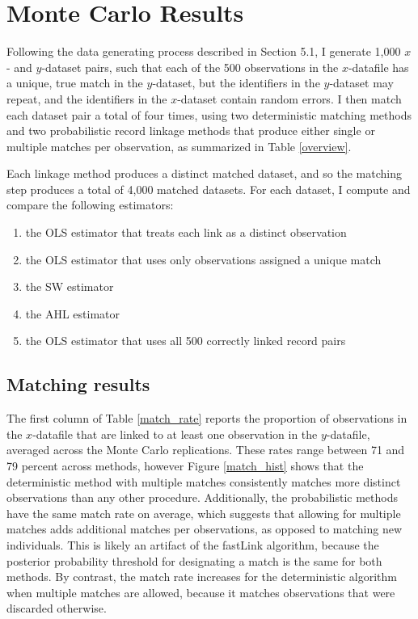 \documentclass[12pt]{article}
\begin{document}
\section{Monte Carlo Results}

Following the data generating process described in Section 5.1, I generate 1,000 $x$- and $y$-dataset pairs, such that each of the 500 observations in the $x$-datafile has a unique, true match in the $y$-dataset, but the identifiers in the $y$-dataset may repeat, and the identifiers in the $x$-dataset contain random errors.  I then match each dataset pair a total of four times, using two deterministic matching methods and two probabilistic record linkage methods that produce either single or multiple matches per observation, as summarized in Table \ref{overview}.




Each linkage method produces a distinct matched dataset, and so the matching step produces a total of 4,000 matched datasets.  For each dataset, I compute and compare the following estimators:
\begin{enumerate}
\item the OLS estimator that treats each link as a distinct observation 
\item the OLS estimator that uses only observations assigned a unique match
\item the SW estimator 
\item the AHL estimator 
\item the OLS estimator that uses all 500 correctly linked record pairs
\end{enumerate}

\subsection{Matching results}
The first column of Table \ref{match_rate} reports the proportion of observations in the $x$-datafile that are linked to at least one observation in the $y$-datafile, averaged across the Monte Carlo replications.  These rates range between 71 and 79 percent across methods, however Figure \ref{match_hist} shows that the deterministic method with multiple matches consistently matches more distinct observations than any other procedure.  Additionally, the probabilistic methods have the same match rate on average, which suggests that allowing for multiple matches adds additional matches per observations, as opposed to matching new individuals.  This is likely an artifact of the fastLink algorithm, because the posterior probability threshold for designating a match is the same for both methods.  By contrast, the match rate increases for the deterministic algorithm when multiple matches are allowed, because it matches observations that were discarded otherwise. 
\end{document}
